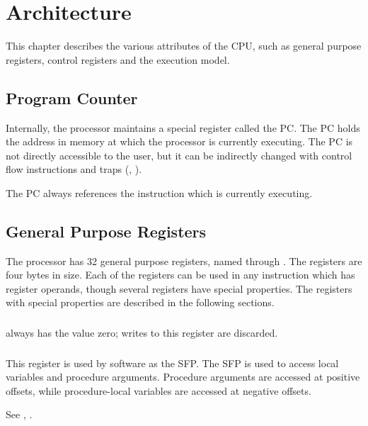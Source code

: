 \chapter{Architecture}
This chapter describes the various attributes of the \ac{CPU}, such as
general purpose registers, control registers and the execution model.

\section{Program Counter}

Internally, the processor maintains a special register called the
\ac{PC}.  The \ac{PC} holds the address in memory at which the
processor is currently executing.  The \ac{PC} is not directly
accessible to the user, but it can be indirectly changed with control
flow instructions and traps (, ).

The \ac{PC} always references the instruction which is currently
executing.

\section{General Purpose Registers}

The processor has 32 general purpose registers, named 
through .  The registers are four bytes in size. Each of
the registers can be used in any instruction which has register
operands, though several registers have special properties.  The
registers with special properties are described in the following
sections.

\subsection{}

 always has the value zero; writes to this register are
discarded.

\subsection{}

This register is used by software as the \ac{SFP}.  The \ac{SFP} is
used to access local variables and procedure arguments.  Procedure
arguments are accessed at positive offsets, while procedure-local
variables are accessed at negative offsets.

See , .

